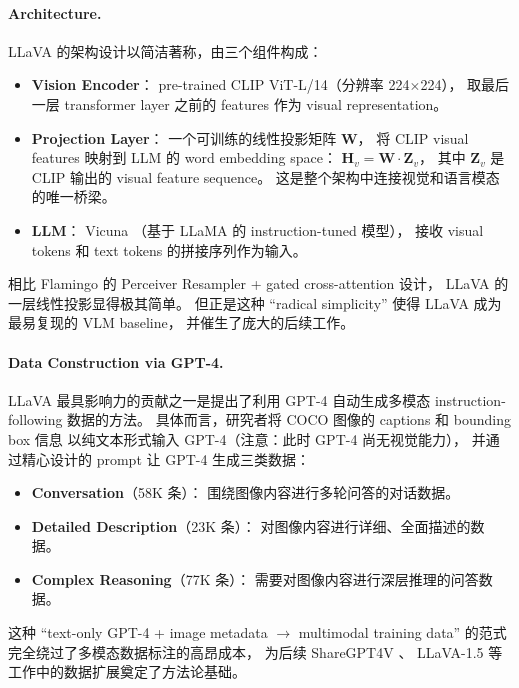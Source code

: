 \paragraph{Architecture.}
LLaVA 的架构设计以简洁著称，由三个组件构成：
\begin{itemize}[leftmargin=2em]
  \item \textbf{Vision Encoder}：
    pre-trained CLIP ViT-L/14（分辨率 224$\times$224），
    取最后一层 transformer layer 之前的 features 作为 visual representation。
  \item \textbf{Projection Layer}：
    一个可训练的线性投影矩阵 $\mathbf{W}$，
    将 CLIP visual features 映射到 LLM 的 word embedding space：
    $\mathbf{H}_v = \mathbf{W} \cdot \mathbf{Z}_v$，
    其中 $\mathbf{Z}_v$ 是 CLIP 输出的 visual feature sequence。
    这是整个架构中连接视觉和语言模态的唯一桥梁。
  \item \textbf{LLM}：
    Vicuna \cite{chiang2023vicuna}（基于 LLaMA 的 instruction-tuned 模型），
    接收 visual tokens 和 text tokens 的拼接序列作为输入。
\end{itemize}

\noindent
相比 Flamingo 的 Perceiver Resampler + gated cross-attention 设计，
LLaVA 的一层线性投影显得极其简单。
但正是这种 ``radical simplicity'' 使得 LLaVA 成为最易复现的 VLM baseline，
并催生了庞大的后续工作。

\paragraph{Data Construction via GPT-4.}
LLaVA 最具影响力的贡献之一是提出了利用 GPT-4 自动生成多模态 instruction-following 数据的方法。
具体而言，研究者将 COCO \cite{lin2014coco} 图像的 captions 和 bounding box 信息
以纯文本形式输入 GPT-4（注意：此时 GPT-4 尚无视觉能力），
并通过精心设计的 prompt 让 GPT-4 生成三类数据：

\begin{itemize}[leftmargin=2em]
  \item \textbf{Conversation}（58K 条）：
    围绕图像内容进行多轮问答的对话数据。
  \item \textbf{Detailed Description}（23K 条）：
    对图像内容进行详细、全面描述的数据。
  \item \textbf{Complex Reasoning}（77K 条）：
    需要对图像内容进行深层推理的问答数据。
\end{itemize}

\noindent
这种 ``text-only GPT-4 + image metadata $\rightarrow$ multimodal training data'' 的范式
完全绕过了多模态数据标注的高昂成本，
为后续 ShareGPT4V \cite{chen2023sharegpt4v}、
LLaVA-1.5 \cite{liu2023llava15} 等工作中的数据扩展奠定了方法论基础。

